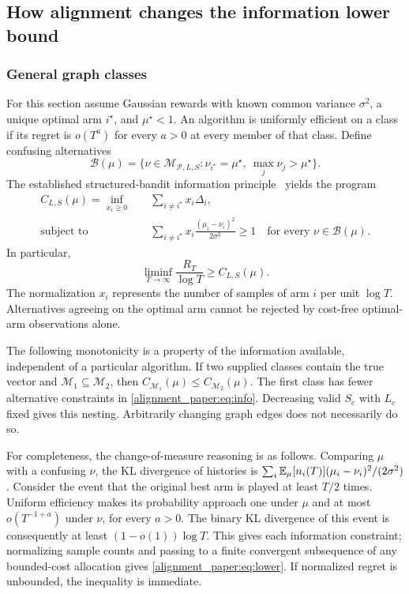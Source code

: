 \subsection{How alignment changes the information lower bound}
\subsubsection{General graph classes}
For this section assume Gaussian rewards with known common variance $\sigma^2$, a unique optimal arm $i^\star$, and $\mu^\star<1$. An algorithm is uniformly efficient on a class if its regret is $o(T^a)$ for every $a>0$ at every member of that class. Define confusing alternatives
\begin{equation}
 \mathcal B(\mu)=\{\nu\in\mathcal M_{\mathcal P,L,S}:
       \nu_{i^\star}=\mu^\star,\ \max_j\nu_j>\mu^\star\}.
\end{equation}
The established structured-bandit information principle~\cite{collected11} yields the program
\begin{align}
 C_{L,S}(\mu)=\inf_{x_i\ge0}\quad&\sum_{i\ne i^\star}x_i\Delta_i,\label{alignment_paper:eq:info}\\
 \text{subject to}\quad&
 \sum_{i\ne i^\star}x_i\frac{(\mu_i-\nu_i)^2}{2\sigma^2}\ge1
       \quad\text{for every }\nu\in\mathcal B(\mu).\nonumber
\end{align}
In particular,
\begin{equation}
 \liminf_{T\to\infty}\frac{R_T}{\log T}\ge C_{L,S}(\mu).
 \label{alignment_paper:eq:lower}
\end{equation}
The normalization $x_i$ represents the number of samples of arm $i$ per unit $\log T$. Alternatives agreeing on the optimal arm cannot be rejected by cost-free optimal-arm observations alone.

The following monotonicity is a property of the information available, independent of a particular algorithm. If two supplied classes contain the true vector and
$\mathcal M_1\subseteq\mathcal M_2$, then $C_{\mathcal M_1}(\mu)\le C_{\mathcal M_2}(\mu)$. The first class has fewer alternative constraints in \eqref{alignment_paper:eq:info}. Decreasing valid $S_c$ with $L_c$ fixed gives this nesting. Arbitrarily changing graph edges does not necessarily do so.

For completeness, the change-of-measure reasoning is as follows. Comparing $\mu$ with a confusing $\nu$, the KL divergence of histories is
$\sum_i\mathbb E_\mu[n_i(T)](\mu_i-\nu_i)^2/(2\sigma^2)$.
Consider the event that the original best arm is played at least $T/2$ times. Uniform efficiency makes its probability approach one under $\mu$ and at most $o(T^{-1+a})$ under $\nu$, for every $a>0$. The binary KL divergence of this event is consequently at least $(1-o(1))\log T$. This gives each information constraint; normalizing sample counts and passing to a finite convergent subsequence of any bounded-cost allocation gives \eqref{alignment_paper:eq:lower}. If normalized regret is unbounded, the inequality is immediate.


